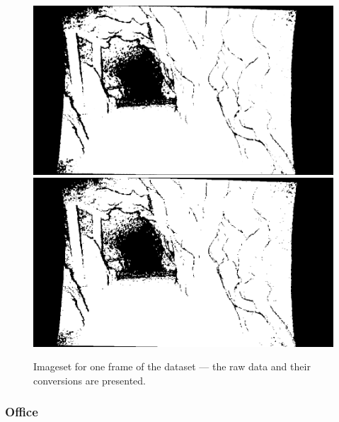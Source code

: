 \begin{figure}[H]
\begin{floatrow}
{    \includegraphics[width=0.5\linewidth]{chapter05/img/lehrpfad/flexion-0000.png}%
    \includegraphics[width=0.5\linewidth]{chapter05/img/lehrpfad/bearing-0000.png}%
    }
    {\caption{Imageset for one frame of the dataset --- the raw data and their conversions are presented.}\label{fig:lehrpfad_data}}
\end{floatrow}
\end{figure}

\subsubsection{Office}

